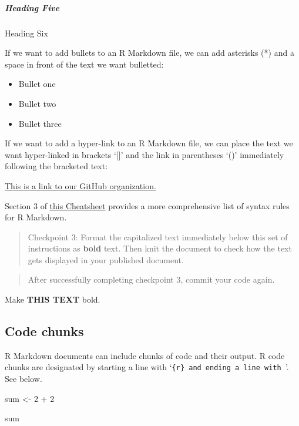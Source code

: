 \documentclass[
]{article}
\newenvironment{Shaded}{\begin{snugshade}}{\end{snugshade}}
\newcommand{\DecValTok}[1]{\textcolor[rgb]{0.00,0.00,0.81}{#1}}
\newcommand{\NormalTok}[1]{#1}
\newcommand{\OtherTok}[1]{\textcolor[rgb]{0.56,0.35,0.01}{#1}}
\newcommand{\SpecialCharTok}[1]{\textcolor[rgb]{0.00,0.00,0.00}{#1}}
\providecommand{\tightlist}{%
  \setlength{\itemsep}{0pt}\setlength{\parskip}{0pt}}
\begin{document}
\hypertarget{heading-five}{%
\subparagraph{Heading Five}\label{heading-five}}

Heading Six

If we want to add bullets to an R Markdown file, we can add asterisks
(*) and a space in front of the text we want bulletted:

\begin{itemize}
\tightlist
\item
  Bullet one
\item
  Bullet two
\item
  Bullet three
\end{itemize}

If we want to add a hyper-link to an R Markdown file, we can place the
text we want hyper-linked in brackets `{[}{]}' and the link in
parentheses `()' immediately following the bracketed text:

\href{https://github.com/Critical-Data-Analysis-Group}{This is a link to
our GitHub organization.}

Section 3 of
\href{https://www.rstudio.com/wp-content/uploads/2015/02/rmarkdown-cheatsheet.pdf}{this
Cheatsheet} provides a more comprehensive list of syntax rules for R
Markdown.

\begin{quote}
Checkpoint 3: Format the capitalized text immediately below this set of
instructions as \textbf{bold} text. Then knit the document to check how
the text gets displayed in your published document.
\end{quote}

\begin{quote}
After successfully completing checkpoint 3, commit your code again.
\end{quote}

Make \textbf{THIS TEXT} bold.

\hypertarget{code-chunks}{%
\subsection{Code chunks}\label{code-chunks}}

R Markdown documents can include chunks of code and their output. R code
chunks are designated by starting a line with
`\texttt{\{r\}\textquotesingle{}\ and\ ending\ a\ line\ with\ \textquotesingle{}}'.
See below.

\begin{Shaded}
\begin{Highlighting}[]
\NormalTok{sum }\OtherTok{\textless{}{-}} \DecValTok{2} \SpecialCharTok{+} \DecValTok{2}

\NormalTok{sum}
\end{Highlighting}
\end{Shaded}
\end{document}
